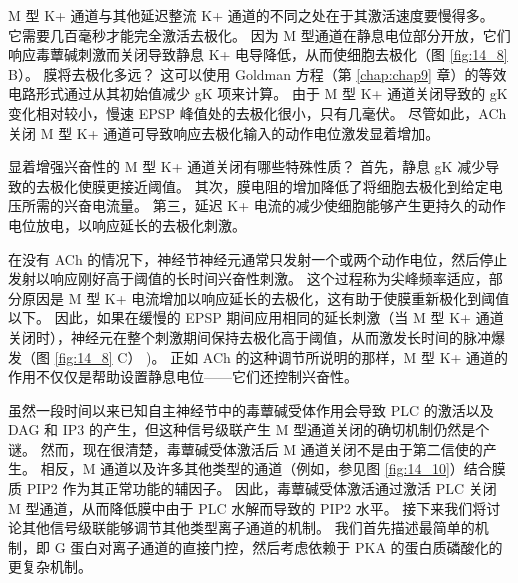 M 型 K+ 通道与其他延迟整流 K+ 通道的不同之处在于其激活速度要慢得多。 
它需要几百毫秒才能完全激活去极化。 
因为 M 型通道在静息电位部分开放，它们响应毒蕈碱刺激而关闭导致静息 K+ 电导降低，从而使细胞去极化（图 \ref{fig:14_8} B）。 
膜将去极化多远？ 
这可以使用 Goldman 方程（第 \ref{chap:chap9} 章）的等效电路形式通过从其初始值减少 gK 项来计算。 
由于 M 型 K+ 通道关闭导致的 gK 变化相对较小，慢速 EPSP 峰值处的去极化很小，只有几毫伏。 
尽管如此，ACh 关闭 M 型 K+ 通道可导致响应去极化输入的动作电位激发显着增加。


显着增强兴奋性的 M 型 K+ 通道关闭有哪些特殊性质？ 
首先，静息 gK 减少导致的去极化使膜更接近阈值。 
其次，膜电阻的增加降低了将细胞去极化到给定电压所需的兴奋电流量。 
第三，延迟 K+ 电流的减少使细胞能够产生更持久的动作电位放电，以响应延长的去极化刺激。


在没有 ACh 的情况下，神经节神经元通常只发射一个或两个动作电位，然后停止发射以响应刚好高于阈值的长时间兴奋性刺激。 
这个过程称为尖峰频率适应，部分原因是 M 型 K+ 电流增加以响应延长的去极化，这有助于使膜重新极化到阈值以下。 
因此，如果在缓慢的 EPSP 期间应用相同的延长刺激（当 M 型 K+ 通道关闭时），神经元在整个刺激期间保持去极化高于阈值，从而激发长时间的脉冲爆发（图 \ref{fig:14_8} C） )。
正如 ACh 的这种调节所说明的那样，M 型 K+ 通道的作用不仅仅是帮助设置静息电位——它们还控制兴奋性。


虽然一段时间以来已知自主神经节中的毒蕈碱受体作用会导致 PLC 的激活以及 DAG 和 IP3 的产生，但这种信号级联产生 M 型通道关闭的确切机制仍然是个谜。 
然而，现在很清楚，毒蕈碱受体激活后 M 通道关闭不是由于第二信使的产生。 
相反，M 通道以及许多其他类型的通道（例如，参见图 \ref{fig:14_10}）结合膜质 PIP2 作为其正常功能的辅因子。 
因此，毒蕈碱受体激活通过激活 PLC 关闭 M 型通道，从而降低膜中由于 PLC 水解而导致的 PIP2 水平。 
接下来我们将讨论其他信号级联能够调节其他类型离子通道的机制。 
我们首先描述最简单的机制，即 G 蛋白对离子通道的直接门控，然后考虑依赖于 PKA 的蛋白质磷酸化的更复杂机制。

